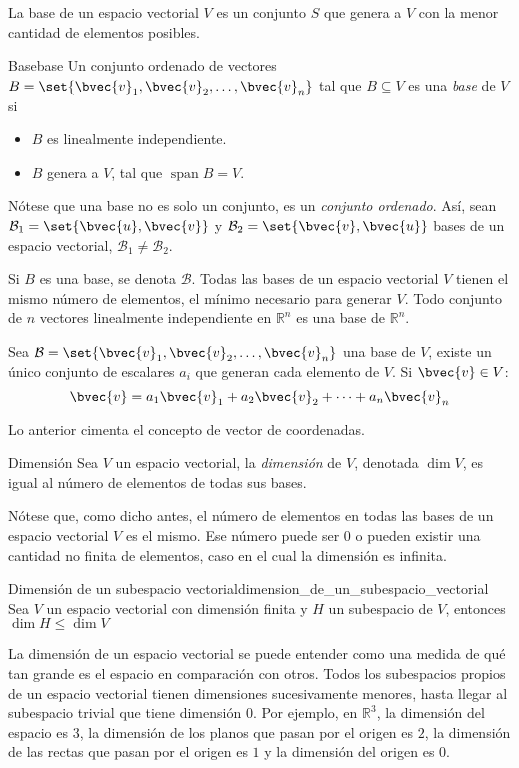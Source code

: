 \documentclass{fmbnotes}
\begin{document}
La base de un espacio vectorial \(V\) es un conjunto \(S\) que genera a \(V\) con la menor cantidad de elementos posibles.

\begin{definicion}{Base}{base}
Un conjunto ordenado de vectores \(B=\set{\bvec{v}_1,\bvec{v}_2,\ldots,\bvec{v}_n}\) tal que \(B \subseteq V\) es una \emph{base} de \(V\) si
\begin{itemize}
\item \(B\) es linealmente independiente.
\item \(B\) genera a \(V\), tal que \(\operatorname{span} B =V\).
\end{itemize}
\end{definicion}
\begin{advertencia}
	Nótese que una base no es solo un conjunto, es un \emph{conjunto ordenado}. Así, sean \(\mathcal{B}_1=\set{\bvec{u},\bvec{v}}\) y \(\mathcal{B}_2=\set{\bvec{v},\bvec{u}}\) bases de un espacio vectorial, \(\mathcal{B}_1\neq\mathcal{B}_2\).
\end{advertencia}

Si \(B\) es una base, se denota \(\mathcal{B}\). Todas las bases de un espacio vectorial \(V\) tienen el mismo número de elementos, el mínimo necesario para generar \(V\). Todo conjunto de \(n\) vectores linealmente independiente en \(\mathbb{R}^{n}\) es una base de \(\mathbb{R}^{n}\).

\begin{teorema}{}{}
Sea \(\mathcal{B}=\set{\bvec{v}_1,\bvec{v}_2,\ldots,\bvec{v}_n}\) una base de \(V\), existe un único conjunto de escalares \(a_i\) que generan cada elemento de \(V\). Si \(\bvec{v} \in V\):
\[\bvec{v}=a_1\bvec{v}_1+a_2\bvec{v}_2+\cdots+a_n\bvec{v}_n\]
\end{teorema}
Lo anterior cimenta el concepto de vector de coordenadas.

\begin{definicion}{Dimensión}{}
Sea \(V\) un espacio vectorial, la \emph{dimensión} de \(V\), denotada \( \dim V \), es igual al número de elementos de todas sus bases. 
\end{definicion}
Nótese que, como dicho antes, el número de elementos en todas las bases de un espacio vectorial \(V\) es el mismo. Ese número puede ser 0 o pueden existir una cantidad no finita de elementos, caso en el cual la dimensión es infinita.

\begin{propiedad}{Dimensión de un subespacio vectorial}{dimension_de_un_subespacio_vectorial}
Sea \(V\) un espacio vectorial con dimensión finita y \(H\) un subespacio de \(V\), entonces \(\dim H \leq \dim V\)
\end{propiedad}
La dimensión de un espacio vectorial se puede entender como una medida de qué tan grande es el espacio en comparación con otros. Todos los subespacios propios de un espacio vectorial tienen dimensiones sucesivamente menores, hasta llegar al subespacio trivial que tiene dimensión 0. Por ejemplo, en \(\mathbb{R}^{3}\), la dimensión del espacio es \(3\), la dimensión de los planos que pasan por el origen es \(2\), la dimensión de las rectas que pasan por el origen es \(1\) y la dimensión del origen es \(0\).
\end{document}
